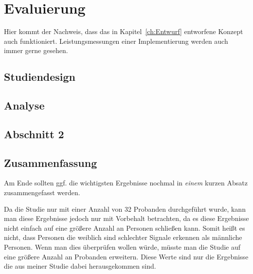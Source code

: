 
\chapter{Evaluierung}
\label{ch:Evaluierung}
Hier kommt der Nachweis, dass das in Kapitel~\ref{ch:Entwurf}
entworfene Konzept auch funktioniert. Leistungsmessungen einer
Implementierung werden auch immer gerne gesehen.


\section{Studiendesign}
\label{ch:Implementierung:sec:Studiendesign}







\section{Analyse}
\label{ch:Evaluierung:sec:Abschnitt1}



\section{Abschnitt 2}
\label{ch:Evaluierung:sec:Abschnitt2}



\section{Zusammenfassung}
\label{ch:Evaluierung:sec:zusammenfassung}

Am Ende sollten ggf. die wichtigsten Ergebnisse nochmal in \emph{einem}
kurzen Absatz zusammengefasst werden.

Da die Studie nur mit einer Anzahl von 32 Probanden durchgeführt wurde, kann man diese Ergebnisse jedoch nur mit Vorbehalt betrachten, da es diese Ergebnisse nicht einfach auf eine größere Anzahl an Personen schließen kann. 
Somit heißt es nicht, dass Personen die weiblich sind schlechter Signale erkennen als männliche Personen. Wenn man dies überprüfen wollen würde, müsste man die Studie auf eine größere Anzahl an Probanden erweitern. Diese Werte sind nur die Ergebnisse die aus meiner Studie dabei herausgekommen sind.

